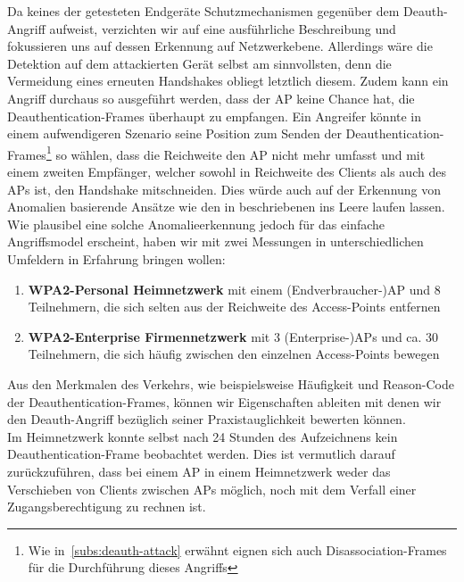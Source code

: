 Da keines der getesteten Endgeräte Schutzmechanismen gegenüber dem Deauth-Angriff aufweist, verzichten wir auf eine ausführliche Beschreibung und fokussieren uns auf dessen Erkennung auf Netzwerkebene. Allerdings wäre die Detektion auf dem attackierten Gerät selbst am sinnvollsten, denn die Vermeidung eines erneuten Handshakes obliegt letztlich diesem. Zudem kann ein Angriff durchaus so ausgeführt werden, dass der AP keine Chance hat, die Deauthentication-Frames überhaupt zu empfangen.
Ein Angreifer könnte in einem aufwendigeren Szenario seine Position zum Senden der Deauthentication-Frames\footnote{Wie in~\ref{subs:deauth-attack} erwähnt eignen sich auch Disassociation-Frames für die Durchführung dieses Angriffs} so wählen, dass die Reichweite den AP nicht mehr umfasst und mit einem zweiten Empfänger, welcher sowohl in Reichweite des Clients als auch des APs ist, den Handshake mitschneiden.
Dies würde auch auf der Erkennung von Anomalien basierende Ansätze wie den in \cite{cheema2011deauth} beschriebenen ins Leere laufen lassen. Wie plausibel eine solche Anomalieerkennung jedoch für das einfache Angriffsmodel erscheint, haben wir mit zwei Messungen in unterschiedlichen Umfeldern in Erfahrung bringen wollen:
\begin{enumerate}
	\item \textbf{WPA2-Personal Heimnetzwerk} mit einem (Endverbraucher-)AP und 8 Teilnehmern, die sich selten aus der Reichweite des Access-Points entfernen
	\item \textbf{WPA2-Enterprise Firmennetzwerk} mit 3 (Enterprise-)APs und ca. 30 Teilnehmern, die sich häufig zwischen den einzelnen Access-Points bewegen
\end{enumerate}
Aus den Merkmalen des Verkehrs, wie beispielsweise Häufigkeit und Reason-Code der Deauthentication-Frames, können wir Eigenschaften ableiten mit denen wir den Deauth-Angriff bezüglich seiner Praxistauglichkeit bewerten können.\\

Im Heimnetzwerk konnte selbst nach 24 Stunden des Aufzeichnens kein Deauthentication-Frame beobachtet werden. Dies ist vermutlich darauf zurückzuführen, dass bei einem AP in einem Heimnetzwerk weder das Verschieben von Clients zwischen APs möglich, noch mit dem Verfall einer Zugangsberechtigung zu rechnen ist.

